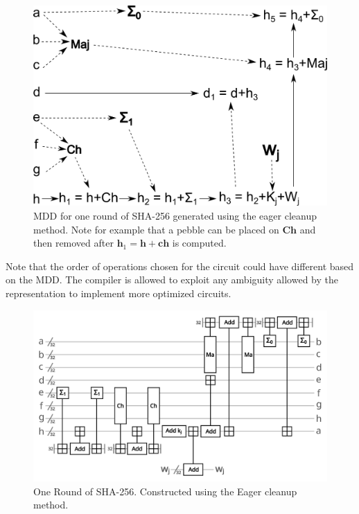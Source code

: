 \begin{figure}
      \capstart
      \centering
      \includegraphics[width=0.7\hsize]{images/sha_MDD}

      \caption{MDD for one round of SHA-256 generated using the eager cleanup
      method. Note for example that a pebble can be placed on $\mathbf{Ch}$ and
      then removed after $\mathbf{h}_1 = \mathbf{h}+\mathbf{ch}$ is computed.}

      \label{fig:sha-MDD}
\end{figure}

Note that the order of operations chosen for the circuit could have different
based on the MDD. The compiler is allowed to exploit any ambiguity allowed by
the representation to implement more optimized circuits.

\begin{figure}
      \capstart
      \centering
      \includegraphics[width=0.9\hsize]{images/sha_round}
      \caption{One Round of SHA-256. Constructed using the Eager cleanup method.}
      \label{fig:sha}
\end{figure}
